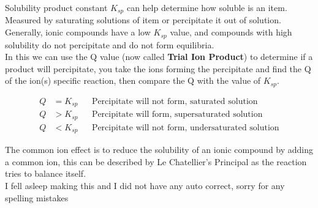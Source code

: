 \documentclass{article}
\begin{document}
\begin{paragraph}
\begin{center}


\end{center}

Solubility product constant $K_{sp}$ can help determine how soluble is an item. Measured by saturating solutions of item or percipitate it out of solution. Generally, ionic compounds have a low $K_{sp}$ value, and compounds with high solubility do not percipitate and do not form equilibria.
\\

In this we can use the Q value (now called \textbf{Trial Ion Product}) to determine if a product will percipitate, you take the ions forming the percipitate and find the Q of the ion(s) specific reaction, then compare the Q with the value of $K_{sp}$.

\begin{align*}
  Q &= K_{sp} && \text{Percipitate will not form, saturated solution}   \\
  Q &> K_{sp} &&  \text{Percipitate will form, supersaturated solution}  \\
  Q &< K_{sp} &&  \text{Percipitate will not form, undersaturated solution}
\end{align*}

The common ion effect is to reduce the solubility of an ionic compound by adding a common ion, this can be described by Le Chatellier's Principal as the reaction tries to balance itself.\\

\scriptsize{I fell asleep making this and I did not have any auto correct, sorry for any spelling mistakes}

\end{paragraph}
\end{document}
